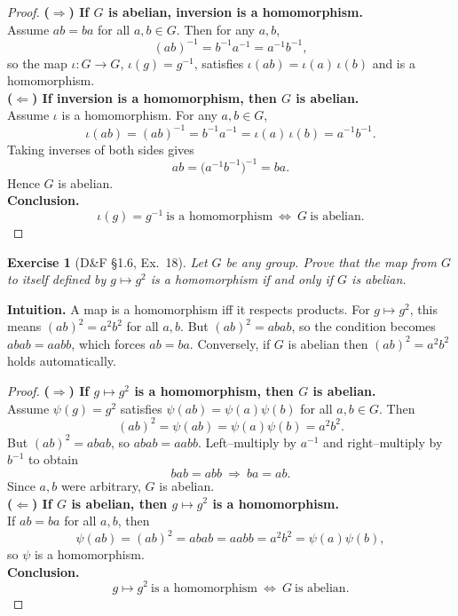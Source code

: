 \documentclass[12pt]{article}
\newtheorem{exercise}[theorem]{Exercise}
\theoremstyle{definition}
\begin{document}
\dotfill

\begin{proof}
\noindent\textbf{($\Rightarrow$) If $G$ is abelian, inversion is a homomorphism.}\\
\noindent Assume $ab=ba$ for all $a,b\in G$. Then for any $a,b$,
\[
(ab)^{-1}=b^{-1}a^{-1}=a^{-1}b^{-1},
\]
so the map $\iota:G\to G$, $\iota(g)=g^{-1}$, satisfies $\iota(ab)=\iota(a)\,\iota(b)$ and is a homomorphism.\\

\noindent\textbf{($\Leftarrow$) If inversion is a homomorphism, then $G$ is abelian.}\\
\noindent Assume $\iota$ is a homomorphism. For any $a,b\in G$,
\[
\iota(ab)=(ab)^{-1}=b^{-1}a^{-1}=\iota(a)\,\iota(b)=a^{-1}b^{-1}.
\]
Taking inverses of both sides gives
\[
ab=\big(a^{-1}b^{-1}\big)^{-1}=ba.
\]
Hence $G$ is abelian.\\

\noindent\textbf{Conclusion.}
\[
\boxed{\,\iota(g)=g^{-1}\ \text{is a homomorphism}\ \Longleftrightarrow\ G\ \text{is abelian}.\,}
\]
\end{proof}

\newpage

\begin{exercise}[D\&F §1.6, Ex.~18]
Let $G$ be any group. Prove that the map from $G$ to itself defined by $g\mapsto g^{2}$ is a homomorphism if and only if $G$ is abelian.
\end{exercise}

\dotfill

\noindent\textbf{Intuition.}
A map is a homomorphism iff it respects products. For $g\mapsto g^2$, this means $(ab)^2=a^2b^2$ for all $a,b$. But $(ab)^2=abab$, so the condition becomes $abab=aabb$, which forces $ab=ba$. Conversely, if $G$ is abelian then $(ab)^2=a^2b^2$ holds automatically.\\

\dotfill

\begin{proof}
\noindent\textbf{($\Rightarrow$) If $g\mapsto g^2$ is a homomorphism, then $G$ is abelian.}\\
\noindent Assume $\psi(g)=g^2$ satisfies $\psi(ab)=\psi(a)\psi(b)$ for all $a,b\in G$. Then
\[
(ab)^2=\psi(ab)=\psi(a)\psi(b)=a^2b^2.
\]
But $(ab)^2=abab$, so $abab=aabb$. Left–multiply by $a^{-1}$ and right–multiply by $b^{-1}$ to obtain
\[
bab=abb\ \Longrightarrow\ ba=ab.
\]
Since $a,b$ were arbitrary, $G$ is abelian.\\

\noindent\textbf{($\Leftarrow$) If $G$ is abelian, then $g\mapsto g^2$ is a homomorphism.}\\
\noindent If $ab=ba$ for all $a,b$, then
\[
\psi(ab)=(ab)^2=abab=aabb=a^2b^2=\psi(a)\psi(b),
\]
so $\psi$ is a homomorphism.\\

\noindent\textbf{Conclusion.}
\[
\boxed{\,g\mapsto g^{2}\ \text{is a homomorphism}\ \Longleftrightarrow\ G\ \text{is abelian}.\,}
\]
\end{proof}
\end{document}

